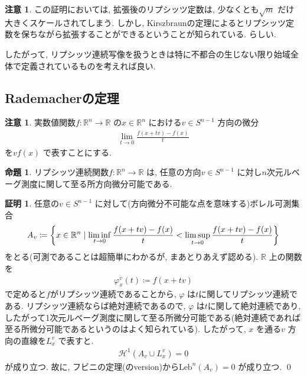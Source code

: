 \documentclass[twocolumn, landscape, a4paper , 8pt, fleqn, titlepage ]{jsarticle}
\theoremstyle{definition}
\newtheorem{prop}[dfn]{命題}
\newtheorem*{pf*}{証明}
\newtheorem{remark}[dfn]{注意}
\newcommand{\cbra}[1]{\mleft\{#1\mright\}}
\newcommand{\Leb}{\textrm{Leb}}
\renewcommand{\-}{\hyphen}
\begin{document}
\begin{remark}
この証明においては, 拡張後のリプシッツ定数は, 少なくとも$\sqrt m$ だけ大きくスケールされてしまう. しかし, Kirszbraunの定理によるとリプシッツ定数を保ちながら拡張することができるということが知られている. らしい. 
\end{remark}

したがって, リプシッツ連続写像を扱うときは特に不都合の生じない限り始域全体で定義されているものを考えれば良い.

\subsection{Rademacherの定理}

\begin{remark}
実数値関数$f: \mathbb R^n \rightarrow \mathbb R$ の$x\in \mathbb R^n$ における$v \in S^{n-1}$ 方向の微分
\begin{align*} \lim_{t\rightarrow 0}\frac{ f(x + tv) - f(x)}{t}\end{align*}
を$v f(x)$ で表すことにする. 
\end{remark}

\begin{prop}\label{2}
リプシッツ連続関数$f:\mathbb R^n \rightarrow \mathbb R$ は, 任意の方向$v \in S^{n-1} $ に対し$n$次元ルベーグ測度に関して至る所方向微分可能である. 
\end{prop}
\begin{pf*}任意の$v \in S^{n-1}$ に対して(方向微分不可能な点を意味する)ボレル可測集合
\begin{align*} A_v \coloneqq \cbra{x \in \mathbb R^n \mid \liminf_{t\rightarrow 0}   \frac{f(x + tv) - f(x)}{t} < \limsup_{t\rightarrow 0}   \frac{f(x + tv) - f(x)}{t}  } \end{align*}
をとる(可測であることは超簡単にわかるが, まあとりあえず認める). $\mathbb R$ 上の関数を
\begin{align*} \varphi_x^v(t) \coloneqq f(x+ t v) \end{align*}
で定めると$f$がリプシッツ連続であることから, $\varphi$ は$t$に関してリプシッツ連続である. リプシッツ連続ならば絶対連続であるので, $\varphi$ は$t$に関して絶対連続であり, したがって1次元ルベーグ測度に関して至る所微分可能である(絶対連続であれば至る所微分可能であるというのはよく知られている). したがって, $x$ を通る$v$ 方向の直線を$L_x^v$ で表すと. 
\begin{align*} \mathcal H^1 (A_v \cup L_x^v) = 0 \end{align*}
が成り立つ. 故に, フビニの定理(のversion)から$\Leb^n (A_v ) = 0$ が成り立つ.
\qed
\end{pf*}
\end{document}
